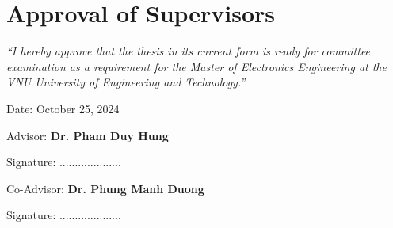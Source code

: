 \chapter*{Approval of Supervisors}

\textit{``I hereby approve that the thesis in its current form is ready for committee examination as a requirement for the Master of Electronics Engineering at the VNU University of Engineering and Technology.''}
\vspace{1cm}

\begin{flushleft}
    Date: October 25, 2024\quad\par

    Advisor: \textbf{Dr. Pham Duy Hung}
    
    \vspace{0.5cm}
    Signature: ....................

    Co-Advisor: \textbf{Dr. Phung Manh Duong}

    \vspace{0.5cm}
    Signature: ....................
\end{flushleft}